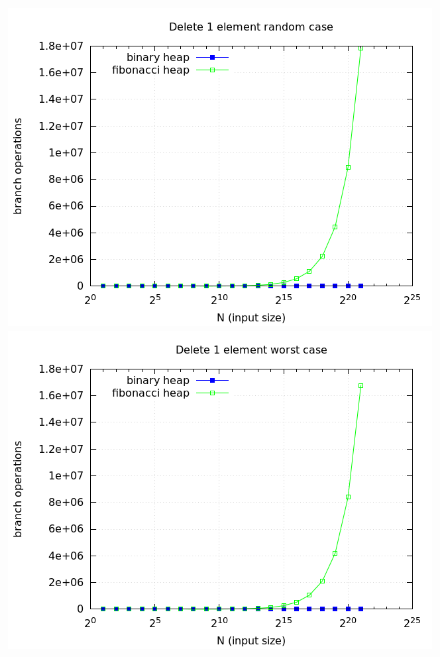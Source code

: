 \documentclass[a4paper,oneside,article,11pt]{memoir}
\begin{document}
\begin{figure}[H]
\centering
\begin{minipage}{0.48\columnwidth}
  \centering
  \includegraphics[width=\linewidth]{../res/delmin/delmin_del_1_branch_random.png}%
  \caption{}
  \label{fig:delmin_1_random_branch}
\end{minipage}%
\hfill
\begin{minipage}{0.48\columnwidth}
  \centering
  \includegraphics[width=\linewidth]{../res/delmin/delmin_del_1_branch_worst.png}%
  \caption{}
  \label{fig:delmin_1_worst_branch}
\end{minipage}
\end{figure}
\end{document}
